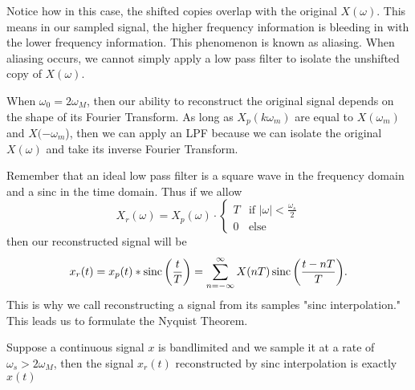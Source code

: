 \begin{gitbook-image}
\begin{figure}[H]
    \centering
\end{figure}
\end{gitbook-image}
Notice how in this case, the shifted copies overlap with the original $X(\omega)$. This means in our sampled signal, the higher frequency
information is bleeding in with the lower frequency information. This phenomenon is known as aliasing. When aliasing occurs, we cannot simply
apply a low pass filter to isolate the unshifted copy of $X(\omega)$.

When $\omega_0 = 2\omega_M$, then our ability to reconstruct the original signal depends on the shape of its Fourier Transform. As long as $X_p(k\omega_m)$
are equal to $X(\omega_m)$ and $X(-\omega_m$), then we can apply an LPF because we can isolate the original $X(\omega)$ and take its inverse Fourier Transform.

Remember that an ideal low pass filter is a square wave in the frequency domain and a sinc in the time domain. Thus if we allow
\[
  X_r(\omega) = X_p(\omega)\cdot \begin{cases}
	T & \text{if } |\omega| < \frac{\omega_s}{2}\\
	0 & \text{else }
  \end{cases}
\]
then our reconstructed signal will be
\[
  x_r(t) = x_p(t)*\operatorname*{sinc}\left(\frac{t}{T}\right) = \sum_{n=-\infty}^{\infty}{X(nT)\operatorname*{sinc}\left(\frac{t-nT}{T}\right)}.
\]
This is why we call reconstructing a signal from its samples "sinc interpolation."
This leads us to formulate the Nyquist Theorem.
\begin{theorem}

    Suppose a continuous signal $x$ is bandlimited and we sample it at a rate of $\omega_s > 2\omega_M$, then the signal $x_r(t)$ reconstructed by sinc interpolation is exactly $x(t)$
\end{theorem}

